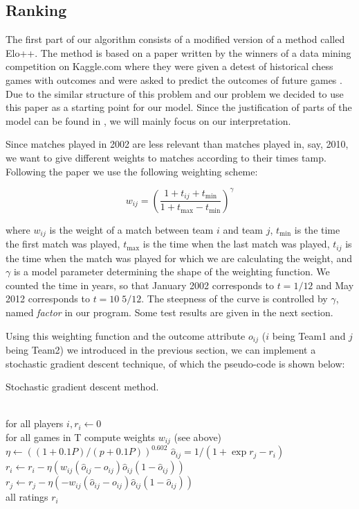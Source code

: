 \documentclass{llncs}
\begin{document}
\subsection{Ranking}
The first part of our algorithm consists of a modified version of a method called Elo++. The method is based on a paper written by the winners of a data mining competition on Kaggle.com where they were given a detest of historical chess games with outcomes and were asked to predict the outcomes of future games \cite{Sismanis}. Due to the similar structure of this problem and our problem we decided to use this paper as a starting point for our model. Since the justification of parts of the model can be found in \cite{Sismanis}, we will mainly focus on our interpretation.

Since matches played in 2002 are less relevant than matches played in, say, 2010, we want to give different weights to matches according to their times tamp. Following the paper we use the following weighting scheme:

\begin{equation*}
    w_{ij} = \left(\frac{1 + t_{ij} + t_{\text{min}}}{1 + t_{\text{max}} - t_{\text{min}}}\right)^{\gamma}
\end{equation*}

where $w_{ij}$ is the weight of a match between team $i$ and team $j$, $t_{\text{min}}$ is the time the first match was played, $t_{\text{max}}$ is the time when the last match was played, $t_{ij}$ is the time when the match was played for which we are calculating the weight, and $\gamma$ is a model parameter determining the shape of the weighting function. We counted the time in years, so that January 2002 corresponds to $t = 1/12$ and May 2012 corresponds to $t = 10 \; 5/12$. The steepness of the curve is controlled by $\gamma$, named \emph{factor} in our program. Some test results are given in the next section.

Using this weighting function and the outcome attribute $o_{ij}$ ($i$ being Team1 and $j$ being Team2) we introduced in the previous section, we can implement a stochastic gradient descent technique, of which the pseudo-code is shown below:

\begin{algorithm}[H]
\caption{Stochastic gradient descent method.}
\begin{algorithmic}
 \\
for all players $i, r_i\gets 0$ \\
for all games in T compute weights $w_{ij}$ (see above)
\State $\eta \gets ((1 + 0.1P)/(p + 0.1P))^{0.602}$
    \State $\hat{o}_{ij} = 1/(1 + \exp{r_j - r_i})$
    \State $r_i \gets r_i - \eta(w_{ij}(\hat{o}_{ij} - o_{ij})\hat{o}_{ij}(1 - \hat{o}_{ij}))$
    \State $r_j \gets r_j - \eta(-w_{ij}(\hat{o}_{ij} - o_{ij})\hat{o}_{ij}(1 - \hat{o}_{ij}))$
    \EndFor
\EndFor \\
\Return all ratings $r_i$
\end{algorithmic}
\label{alg:1}
\end{algorithm}
\end{document}
